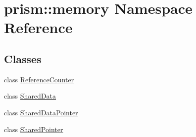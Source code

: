 \hypertarget{namespaceprism_1_1memory}{}\section{prism\+:\+:memory Namespace Reference}
\label{namespaceprism_1_1memory}
\subsection*{Classes}
\begin{DoxyCompactItemize}
\item 
class \hyperlink{classprism_1_1memory_1_1_reference_counter}{Reference\+Counter}
\item 
class \hyperlink{classprism_1_1memory_1_1_shared_data}{Shared\+Data}
\item 
class \hyperlink{classprism_1_1memory_1_1_shared_data_pointer}{Shared\+Data\+Pointer}
\item 
class \hyperlink{classprism_1_1memory_1_1_shared_pointer}{Shared\+Pointer}
\end{DoxyCompactItemize}
